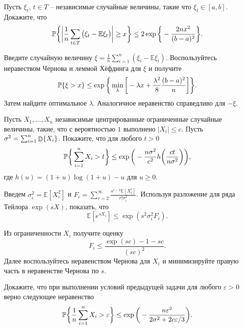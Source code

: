 \begin{problem} Пусть $\xi_t$, $t\in T$ -- независимые случайные величины, такие что $\xi_t\in[a,b]$. Докажите, что 
\begin{equation*}
\mathrm{{\mathbb P}}\bigg\{\bigg|\frac{1}{n}\sum_{t\in T}\big(\xi_t-\mathbb{E}\xi_t\bigr)\biggr|\geq x\biggr\}\leq 2\exp\bigg\{-\frac{2nx^2}{(b-a)^2}\biggr\}.
\end{equation*}
\end{problem}
\begin{ordre}
Введите случайную величину $\xi = \frac{1}{n}\sum_{i=1}^n(\xi_i-\mathbb{E}\xi_i)$.
Воспользуйтесь неравеством Чернова и леммой Хёфдинга для $\xi$ и получите
\begin{equation*}
\mathrm{{\mathbb P}}\{\xi>x\}\leq \exp\bigg\{\min_{\lambda}\bigg[-\lambda x + \frac{\lambda^2}{8}\frac{(b-a)^2}{n}\biggr]\biggr\}.
\end{equation*}
Затем найдите оптимальное $\lambda$.  Аналогичное неравенство справедливо для $-\xi$.
\end{ordre}

\begin{problem}
Пусть $X_1,\dots, X_n$ независимые центрированные ограниченные случайные величины, такие, что с вероятностью $1$ выполнено $|X_i|\leq c$.
Пусть $\sigma^2 = \sum_{i=1}^n\mathop{\mathbb{D}}\nolimits\{X_i\}$.
Покажите, что для любого $t>0$ 
\begin{equation*}
\mathrm{{\mathbb P}}\bigg\{\sum_{i=1}^n X_i>t\biggr\}\leq \exp\bigg(-\frac{n\sigma^2}{c^2}h\bigg(\frac{ct}{n\sigma^2}\biggr)\biggr),
\end{equation*}
где $h(u) = (1+u)\log(1+u)-u$ для $u\geq 0$.
\end{problem}
\begin{ordre}
Введем $\sigma_i^2 = \mathbb{E}[X_i^2]$ и $F_i = \sum_{r=2}^{\infty}\frac{s^{r-2}\mathbb{E}[X_i^r]}{r!\sigma_i^2}$.
Используя разложение для ряда Тейлора $\exp(sX)$, показать, что 
\begin{equation*}
\mathbb{E}[e^{sX_i}]\leq \exp(s^2\sigma^2_iF_i).
\end{equation*}

Из ограниченности  $X_i$ получите оценку
\begin{equation*}
F_i\leq \frac{\exp(sc)-1-sc}{(sc)^2}.
\end{equation*} 
Далее воспользуйтесь неравенством Чернова для $X_i$ и минимизируйте правую часть в неравенстве Чернова по $s$.
\end{ordre}

\begin{problem}
\label{bernstain}
Докажите, что при выполнении условий предыдущей задачи для любого  $\varepsilon>0$ верно следующее неравенство
\begin{equation*}
\mathrm{{\mathbb P}}\bigg\{\frac{1}{n}\sum_{i=1}^n X_i>\varepsilon\biggr\}\leq \exp\bigg(-\frac{n\varepsilon^2}{2\sigma^2+2c\varepsilon/3}\biggr).
\end{equation*}
\end{problem}

